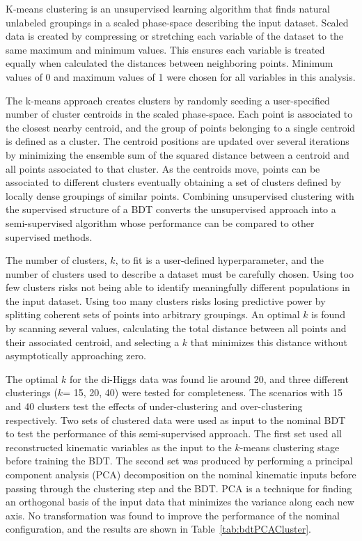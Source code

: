 \label{sec:kmeans}
K-means clustering is an unsupervised learning algorithm that finds natural unlabeled groupings in a scaled phase-space describing the input dataset. Scaled data is created by compressing or stretching each variable of the dataset to the same maximum and minimum values. This ensures each variable is treated equally when calculated the distances between neighboring points. Minimum values of 0 and maximum values of 1 were chosen for all variables in this analysis.

The k-means approach creates clusters by randomly seeding a user-specified number of cluster centroids in the scaled phase-space. Each point is associated to the closest nearby centroid, and the group of points belonging to a single centroid is defined as a cluster. The centroid positions are updated over several iterations by minimizing the ensemble sum of the squared distance between a centroid and all points associated to that cluster. As the centroids move, points can be associated to different clusters eventually obtaining a set of clusters defined by locally dense groupings of similar points. Combining unsupervised clustering with the supervised structure of a BDT converts the unsupervised approach into a semi-supervised algorithm whose performance can be compared to other supervised methods.

The number of clusters, $k$, to fit is a user-defined hyperparameter, and the number of clusters used to describe a dataset must be carefully chosen. Using too few clusters risks not being able to identify meaningfully different populations in the input dataset. Using too many clusters risks losing predictive power by splitting coherent sets of points into arbitrary groupings. An optimal $k$ is found by scanning several values, calculating the total distance between all points and their associated centroid, and selecting a $k$ that minimizes this distance without asymptotically approaching zero.

The optimal $k$ for the di-Higgs data was found lie around 20, and three different clusterings ($k$= 15, 20, 40) were tested for completeness. The scenarios with 15 and 40 clusters test the effects of under-clustering and over-clustering respectively. Two sets of clustered data were used as input to the nominal BDT to test the performance of this semi-supervised approach. The first set used all reconstructed kinematic variables as the input to the $k$-means clustering stage before training the BDT. The second set was produced by performing a principal component analysis (PCA) decomposition on the nominal kinematic inputs before passing through the clustering step and the BDT. PCA is a technique for finding an orthogonal basis of the input data that minimizes the variance along each new axis. No transformation was found to improve the performance of the nominal configuration, and the results are shown in Table~\ref{tab:bdtPCACluster}.

